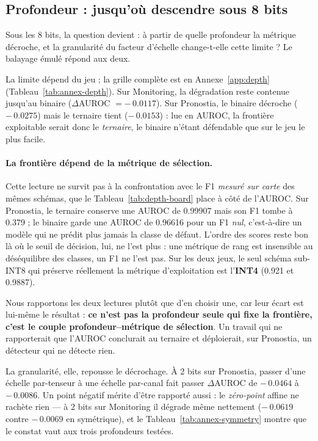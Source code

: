 \subsection{Profondeur : jusqu'où descendre sous 8 bits}

Sous les 8 bits, la question devient : à partir de quelle profondeur la métrique décroche, et la
granularité du facteur d'échelle change-t-elle cette limite ? Le balayage émulé répond aux deux.

La limite dépend du jeu ; la grille complète est en Annexe~\ref{app:depth}
(Tableau~\ref{tab:annex-depth}). Sur Monitoring, la dégradation reste contenue jusqu'au binaire
($\Delta$AUROC $=-\,\num{0.0117}$). Sur Pronostia, le binaire décroche ($-\,\num{0.0275}$) mais le ternaire
tient ($-\,\num{0.0153}$) : lue en AUROC, la frontière exploitable serait donc le \emph{ternaire}, le
binaire n'étant défendable que sur le jeu le plus facile.

\paragraph{La frontière dépend de la métrique de sélection.} Cette lecture ne survit pas à la confrontation
avec le F1 \emph{mesuré sur carte} des mêmes schémas, que le Tableau~\ref{tab:depth-board} place à côté de
l'AUROC. Sur Pronostia, le ternaire conserve une AUROC de \num{0.99907} mais son F1 tombe à \num{0.379} ;
le binaire garde une AUROC de \num{0.96616} pour un F1 \emph{nul}, c'est-à-dire un modèle qui ne prédit
plus jamais la classe de défaut. L'ordre des scores reste bon là où le seuil de décision, lui, ne l'est
plus : une métrique de rang est insensible au déséquilibre des classes, un F1 ne l'est pas. Sur les deux
jeux, le seul schéma sub-INT8 qui préserve réellement la métrique d'exploitation est l'\textbf{INT4}
(\num{0.921} et \num{0.9887}).

Nous rapportons les deux lectures plutôt que d'en choisir une, car leur écart est lui-même le résultat :
\textbf{ce n'est pas la profondeur seule qui fixe la frontière, c'est le couple profondeur--métrique de
sélection}. Un travail qui ne rapporterait que l'AUROC conclurait au ternaire et déploierait, sur
Pronostia, un détecteur qui ne détecte rien.



La granularité, elle, repousse le décrochage. À 2 bits sur Pronostia, passer d'une échelle par-tenseur à
une échelle par-canal fait passer $\Delta$AUROC de $-\,\num{0.0464}$ à $-\,\num{0.0086}$. Un point négatif
mérite d'être rapporté aussi : le \emph{zéro-point} affine ne rachète rien --- à 2 bits sur Monitoring il
dégrade même nettement ($-\,\num{0.0619}$ contre $-\,\num{0.0069}$ en symétrique), et le
Tableau~\ref{tab:annex-symmetry} montre que le constat vaut aux trois profondeurs testées.

